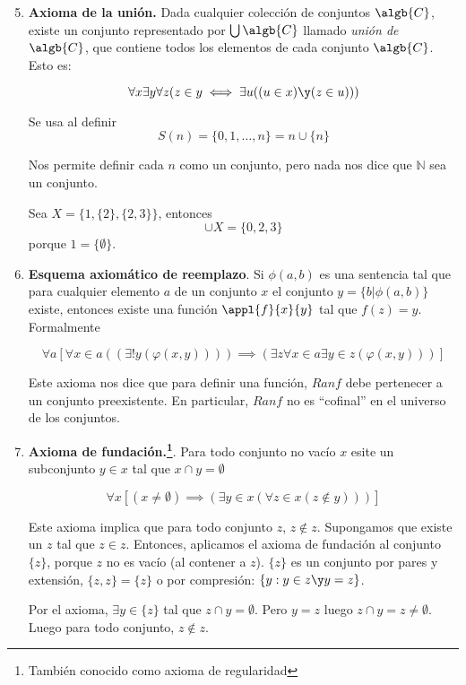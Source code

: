 	\begin{enumerate}
	\setcounter{enumi}{4}
		\item \textbf{Axioma de la unión.} Dada cualquier colección de conjuntos $\algb{C}$, existe un conjunto representado por $\bigcup \algb{C}$ llamado \textit{unión de }$\algb{C}$, que contiene todos los elementos de cada conjunto $\algb{C}$. Esto es:

		 $$\forall x \exists y \forall z (z\in y\iff\exists u((u\in x)\y (z\in u)))$$

		 Se usa al definir $$S(n) = \{0, 1,\hdots,n\} = n\cup \{n\}$$

		 Nos permite definir cada $n$ como un conjunto, pero nada nos dice que $\mathbb{N}$ sea un conjunto.
		 \begin{example}
			Sea $X=\{1,\{2\},\{2,3\}\}$, entonces
			$$\cup X = \{0, 2, 3\}$$ porque $1=\{\emptyset\}$.
		 \end{example}

		 \item \textbf{Esquema axiomático de reemplazo}. Si $\phi(a,b)$ es una sentencia tal que para cualquier elemento $a$ de un conjunto $x$ el conjunto $y=\{b | \phi(a,b)\}$ existe, entonces existe una función $\appl{f}{x}{y}$ tal que $f(z)=y$. Formalmente

		 $$\forall a \left[\forall x\in a ((\exists! y (\varphi(x,y))))\implies (\exists z \forall x \in a \exists y \in z (\varphi(x,y)))\right]$$

		 Este axioma nos dice que para definir una función, $Ran f$ debe pertenecer a un conjunto preexistente. En particular, $Ranf$ no es ``cofinal'' en el universo de los conjuntos.

		 \item \textbf{Axioma de fundación.\footnote{También conocido como axioma de regularidad}}. Para todo conjunto no vacío $x$ esite un subconjunto $y \in x$ tal que $x \cap y = \emptyset$

		 $$\forall x \left[(x\neq \emptyset)\implies (\exists y \in x (\forall z \in x (z\notin y)))\right]$$

		 Este axioma implica que para todo conjunto $z$, $z\notin z$. Supongamos que existe un $z$ tal que $z\in z$. Entonces, aplicamos el axioma de fundación al conjunto $\{z\}$, porque $z$ no es vacío (al contener a $z$).  $\{z\}$ es un conjunto por pares y extensión, $\{z,z\} = \{z\}$ o por compresión: $\{y : y\in z \y  y=z\}$.

		 Por el axioma, $\exists y\in\{z\}$ tal que $z\cap y=\emptyset$. Pero $y=z$ luego $z\cap y = z \neq \emptyset$. Luego para todo conjunto, $z\notin z$.


\end{enumerate}
